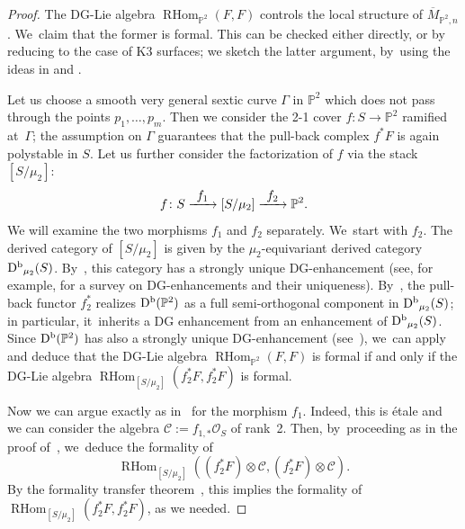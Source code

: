 \documentclass[JEP,XML,SOM,Unicode,published]{cedram}
\newcommand\To[1]{\mathchoice{\xrightarrow{\textstyle\kern4pt#1\kern3pt}}{\stackrel{#1}{\longrightarrow}}{}{}}
\newcommand{\PP}{{\mathbb P}}\let\P\PP
\newcommand\cC{\mathcal{C}}
\newcommand\cO{\mathcal{O}}
\DeclareMathOperator{\Db}{D^{\textup b}}
\DeclareMathOperator{\RHom}{RHom}
\theoremstyle{definition}
\begin{document}
\begin{proof}
The DG-Lie algebra $\RHom_{\PP^2}(F,F)$ controls the local structure of $\overline{M}_{\PP^2,n}$. We~claim that the former is formal.
This can be checked either directly, or by reducing to the case of K3 surfaces; we sketch the latter argument, by~using the ideas in \cite{BZ:Kuranishi} and \cite{BMM:Formality}.

Let us choose a smooth very general sextic curve $\mathsf{\Gamma}$ in $\PP^2$ which does not pass through the points $p_1,\dots,p_m$. Then we consider the 2-1 cover $f\colon S\to \PP^2$ ramified at~$\mathsf{\Gamma}$; the assumption on $\mathsf{\Gamma}$ guarantees that the pull-back complex $f^*F$ is again polystable in $S$.
Let us further consider the factorization of $f$ via the stack $\left[S/\mu_2\right]$:
\[
f\colon S \To{f_1} \left[S/\mu_2\right] \To{f_2} \PP^2.
\]
We will examine the two morphisms $f_1$ and $f_2$ separately. We~start with $f_2$.
The derived category of $\left[S/\mu_2\right]$ is given by the $\mu_2$-equivariant derived category $\Db_{\mu_2}(S)$.
By~\cite[Prop.\,6.10]{CanonacoStellari:Uniqueness}, this category has a strongly unique DG-enhancement (see, for example, \cite{CanonacoStellari:Tour} for a survey on DG-enhancements and their uniqueness).
By~\cite{PolVdB:equivariant}, the pull-back functor $f_2^*$ realizes $\Db(\PP^2)$ as a full semi-orthogonal component in $\Db_{\mu_2}(S)$; in particular, it~inherits a DG enhancement from an enhancement of $\Db_{\mu_2}(S)$.
Since $\Db(\PP^2)$ has also a strongly unique DG-enhancement (see~\cite{LO:Uniqueness}), we~can apply~\cite[Prop.\,2.13]{BZ:Kuranishi} and deduce that the DG-Lie algebra $\RHom_{\PP^2}(F,F)$ is formal if and only if the DG-Lie algebra $\RHom_{[S/\mu_2]}(f_2^*F,f_2^*F)$ is formal.

Now we can argue exactly as in~\cite{BMM:Formality} for the morphism $f_1$.
Indeed, this is étale and we can consider the algebra $\cC:=f_{1,*}\cO_S$ of rank~2.
Then, by~proceeding as in the proof of~\cite[Th.\,5.3]{BMM:Formality}, we~deduce the formality of
\[
\RHom_{[S/\mu_2]}((f_2^*F)\otimes\cC,(f_2^*F)\otimes\cC).
\]
By the formality transfer theorem~\cite[Th.\,3.4]{Manetti:FormalityCriteria}, this implies the formality of $\RHom_{[S/\mu_2]}(f_2^*F,f_2^*F)$, as we needed.
\end{proof}
\end{document}
